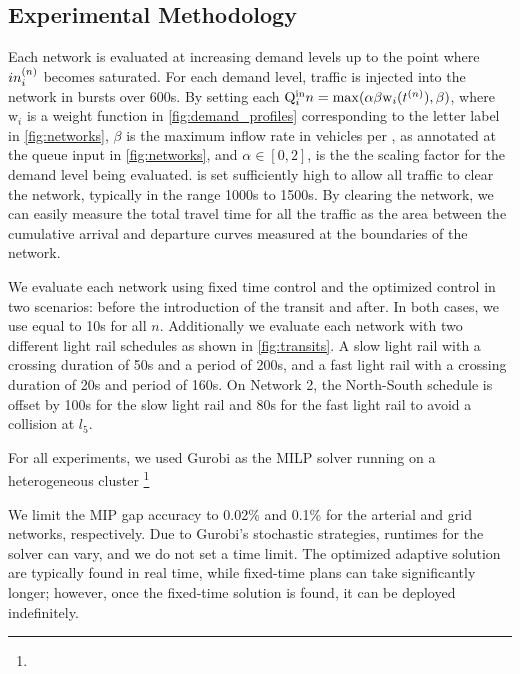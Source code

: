 \subsection{Experimental Methodology}

Each network is evaluated at increasing demand levels up to the point where $\inq{i}$
becomes saturated.
%
%
For each demand level, traffic is injected into the network in bursts over 600s.
By setting each 
$\QIN{i}{n} = \mathrm{max}(\alpha \beta \mathrm{w}_i(\tn[n]),\beta)$, where $\mathrm{w}_i$
is a weight function in \cref{fig:demand_profiles} corresponding to the letter label in 
\cref{fig:networks}, $\beta$ is the maximum inflow rate in vehicles per \DT, as annotated at the queue input in \cref{fig:networks}, and $\alpha \in [0,2]$, is the
the scaling factor for the demand level being evaluated.
\TMAX is set sufficiently high to allow all traffic to clear the network,
typically in the range 1000s to 1500s.
%
By clearing the network, we can easily measure the total travel time for all the
traffic as the area between the cumulative arrival and departure curves measured
at the boundaries of the network.
%
%
%

We evaluate each network using fixed time control and the optimized control in
two scenarios: before the introduction of the transit and
after. In both cases, we use \DT[] equal to 10s for all $n$. Additionally we evaluate each network 
with two different light rail schedules as shown in  \cref{fig:transits}. A slow light rail with a crossing duration of 50s
and a period of 200s, and a fast light rail with a crossing duration of 20s and period of 160s. On Network 2, the North-South schedule is
offset by 100s for the slow light rail and 80s for the fast light rail to avoid a collision at $l_5$.

For all experiments, we used Gurobi as the MILP solver running on a
heterogeneous cluster \footnote{}

We limit the MIP gap accuracy to 0.02\% and 0.1\% for the arterial and grid
networks, respectively.
%
Due to Gurobi's stochastic strategies, runtimes for the solver can vary,
and we do not set a time limit.
%
The optimized adaptive solution are typically found in real time, while
fixed-time plans can take significantly longer; however, once the fixed-time
solution is found, it can be deployed indefinitely.




